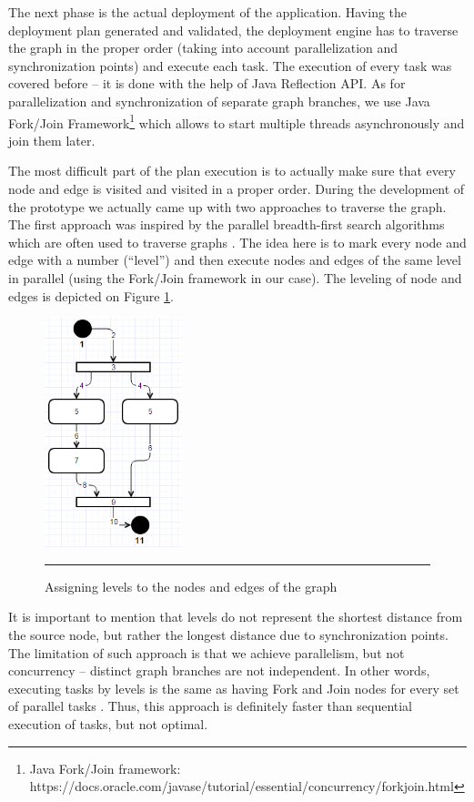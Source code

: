 \noindent The next phase is the actual deployment of the application. Having the deployment plan generated and validated, the deployment engine has to traverse the graph in the proper order (taking into account parallelization and synchronization points) and execute each task. The execution of every task was covered before -- it is done with the help of Java Reflection API. As for parallelization and synchronization of separate graph branches, we use Java Fork/Join Framework\footnote{ Java Fork/Join framework: https://docs.oracle.com/javase/tutorial/essential/concurrency/forkjoin.html} which allows to start multiple threads asynchronously and join them later. 

\noindent The most difficult part of the plan execution is to actually make sure that every node and edge is visited and visited in a proper order. During the development of the prototype we actually came up with two approaches to traverse the graph. The first approach was inspired by the parallel breadth-first search algorithms which are often used to traverse graphs \cite{akeila2010object}. The idea here is to mark every node and edge with a number (``level'') and then execute nodes and edges of the same level in parallel (using the Fork/Join framework in our case). The leveling of node and edges is depicted on Figure \ref{fig:levels}.

\noindent 

\begin{figure}[htbp]
	\centering
		\includegraphics[height=18em]{./Figures/Parallel}
		\rule{38em}{0.5pt}
	\caption[Parallel Algorithm]{Assigning levels to the nodes and edges of the graph}
	\label{fig:levels}
\end{figure}

\noindent 

\noindent It is important to mention that levels do not represent the shortest distance from the source node, but rather the longest distance due to synchronization points. The limitation of such approach is that we achieve parallelism, but not concurrency -- distinct graph branches are not independent. In other words, executing tasks by levels is the same as having Fork and Join nodes for every set of parallel tasks . Thus, this approach is definitely faster than sequential execution of tasks, but not optimal.


